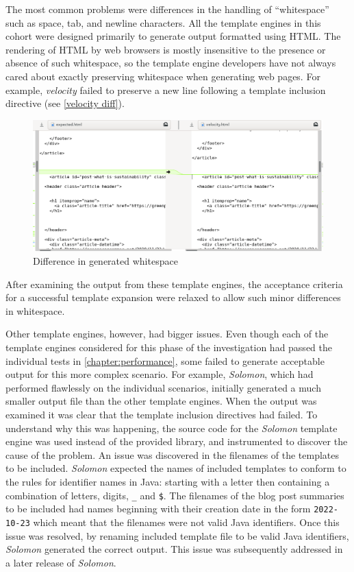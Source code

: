 The most common problems were differences in the handling of \enquote{whitespace} such as space, tab, and newline characters. All the \gls{template engine}s in this cohort were designed primarily to generate output formatted using HTML. The rendering of HTML by web browsers is mostly insensitive to the presence or absence of such whitespace, so the \gls{template engine} developers have not always cared about exactly preserving whitespace when generating web pages. For example, \emph{velocity} failed to preserve a new line following a template inclusion directive (see \autoref{velocity diff}).

\begin{figure}[htbp]
  \centering
  \includegraphics[width=\columnwidth]{Figures/graphs/Page/velocity-diff.png}
  \caption{Difference in generated whitespace}
  \label{velocity diff}
\end{figure}

After examining the output from these \gls{template engine}s, the acceptance criteria for a successful template expansion were relaxed to allow such minor differences in whitespace.

Other \gls{template engine}s, however, had bigger issues. Even though each of the \gls{template engine}s considered for this phase of the investigation had passed the individual tests in \autoref{chapter:performance}, some failed to generate acceptable output for this more complex scenario. For example, \emph{Solomon}, which had performed flawlessly on the individual scenarios, initially generated a much smaller output file than the other \gls{template engine}s. When the output was examined it was clear that the template inclusion directives had failed. To understand why this was happening, the source code for the \emph{Solomon} \gls{template engine} was used instead of the provided library, and instrumented to discover the cause of the problem. An issue was discovered in the filenames of the templates to be included. \emph{Solomon} expected the names of included templates to conform to the rules for identifier names in Java: starting with a letter then containing a combination of letters, digits, \verb!_! and \verb!$!. The filenames of the blog post summaries to be included had names beginning with their creation date in the form \verb!2022-10-23! which meant that the filenames were not valid Java identifiers. Once this issue was resolved, by renaming included template file to be valid Java identifiers, \emph{Solomon} generated the correct output. This issue was subsequently addressed in a later release of \emph{Solomon}.

